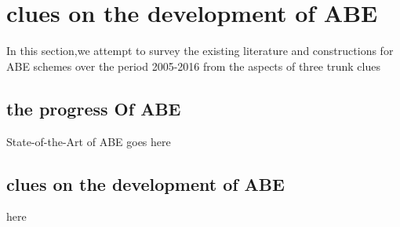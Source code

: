 \section{clues on the development of ABE}
In this section,we attempt to survey the existing literature and constructions for ABE schemes over the period 2005-2016 from the aspects of three trunk clues
\subsection{the progress Of ABE}
State-of-the-Art of ABE goes here

\subsection{clues on the development of ABE}
here
